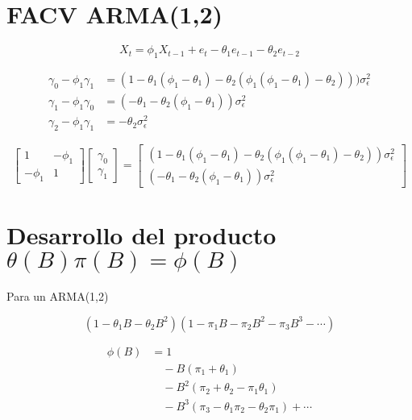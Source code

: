 \documentclass[12pt]{article} %
\begin{document}
\begin{multicols}{2}
\section*{FACV ARMA(1,2)}


\[
X_t = \phi_1 X_{t-1} + e_t - \theta_1 e_{t-1} - \theta_2 e_{t-2}
\]

\begin{align*}
\gamma_0 - \phi_1 \gamma_1
&= (1 - \theta_1(\phi_1 -\theta_1)-\theta_2(\phi_1(\phi_1-\theta_1) - \theta_2))) \sigma^2_{\epsilon} \\
\gamma_1 - \phi_1 \gamma_0
&= (-\theta_1 - \theta_2(\phi_1-\theta_1) )\sigma^2_{\epsilon} \\
\gamma_2 - \phi_1 \gamma_1 &= -\theta_2 \sigma^2_\epsilon
\end{align*}

\[
\begin{bmatrix}
1 & -\phi_1 \\
-\phi_1 & 1
\end{bmatrix}
\begin{bmatrix}
\gamma_0 \\
\gamma_1
\end{bmatrix}
=
\begin{bmatrix}
\left(1 - \theta_1(\phi_1 -\theta_1) - \theta_2(\phi_1(\phi_1-\theta_1) - \theta_2) \right) \sigma^2_{\epsilon} \\
\left(-\theta_1 - \theta_2(\phi_1-\theta_1) \right) \sigma^2_{\epsilon}
\end{bmatrix}
\]










\section*{Desarrollo del producto {$\theta(B)\pi(B)=\phi(B)$}}

Para un ARMA(1,2)

\[
(1 - \theta_1 B - \theta_2 B^2)(1 - \pi_1 B - \pi_2 B^2 - \pi_3 B^3 - \cdots)
\]


\[
\begin{aligned}
\phi(B)&= 1 \\
&\quad - B (\pi_1 + \theta_1) \\
&\quad - B^2 (\pi_2 + \theta_2 - \pi_1 \theta_1) \\
&\quad - B^3 (\pi_3 - \theta_1 \pi_2 - \theta_2 \pi_1) + \cdots
\end{aligned}
\]



\end{multicols}
\end{document}
